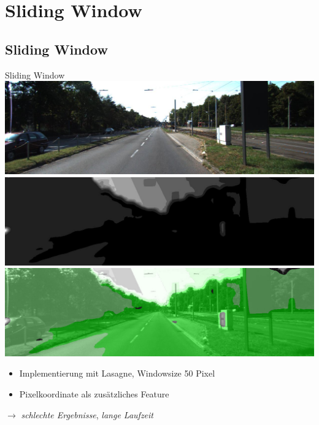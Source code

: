 \section{Sliding Window}

\subsection{Sliding Window}

\begin{frame}{Sliding Window}
  \includegraphics[scale=0.11]{../images/Lasagne/padded.jpg}
  \hspace{0.1cm}
      \includegraphics[scale=0.12]{../images/Lasagne/29x29-color-coordinates.jpg}
         \vspace{0.1cm}
    \includegraphics[scale=0.2]{../images/Lasagne/29x29-color-coordinates-overlay.jpg}
         \begin{itemize}
       \item Implementierung mit Lasagne, Windowsize 50 Pixel
        \item Pixelkoordinate als zusätzliches Feature
    \end{itemize}
  $\rightarrow$ \emph{schlechte Ergebnisse}, \emph{lange Laufzeit}

\end{frame}

